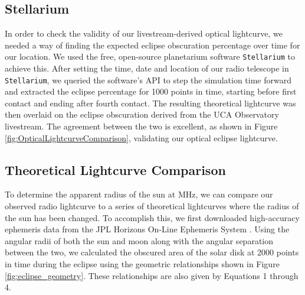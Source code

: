 \subsection{\label{sec:stellarium}Stellarium}

In order to check the validity of our livestream-derived optical lightcurve, we needed a way of finding the expected eclipse obscuration percentage over time for our location.
We used the free, open-source planetarium software \texttt{Stellarium}\cite{zotti_simulated_2020} to achieve this.
After setting the time, date and location of our radio telescope in \texttt{Stellarium}, we queried the software's API to step the simulation time forward and extracted the eclipse percentage for 1000 points in time, starting before first contact and ending after fourth contact.
The resulting theoretical lightcurve was then overlaid on the eclipse obscuration derived from the UCA Observatory livestream.
The agreement between the two is excellent, as shown in Figure \ref{fig:OpticalLightcurveComparison}, validating our optical eclipse lightcurve.

\subsection{\label{sec:theoreticalLightcurves}Theoretical Lightcurve Comparison}

To determine the apparent radius of the sun at \unit[1420]{MHz}, we can compare our observed radio lightcurve to a series of theoretical lightcurves where the radius of the sun has been changed.
To accomplish this, we first downloaded high-accuracy ephemeris data from the JPL Horizons On-Line Ephemeris System \cite{nasa_jpl_solar_system_dynamics_group_jpl_nodate}. 
Using the angular radii of both the sun and moon along with the angular separation between the two, we calculated the obscured area of the solar disk at 2000 points in time during the eclipse using the geometric relationships shown in Figure \ref{fig:eclipse_geometry}.
These relationships are also given by Equations 1 through 4.

